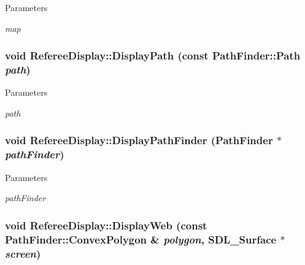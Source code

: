 \begin{DoxyParams}{Parameters}
\item[{\em map}]\end{DoxyParams}
\hypertarget{classRefereeDisplay_ad7f07077e92fd46956bf1aa25715e414}{
\subsubsection[{DisplayPath}]{\setlength{\rightskip}{0pt plus 5cm}void RefereeDisplay::DisplayPath (const {\bf PathFinder::Path} {\em path})}}
\label{classRefereeDisplay_ad7f07077e92fd46956bf1aa25715e414}

\begin{DoxyParams}{Parameters}
\item[{\em path}]\end{DoxyParams}
\hypertarget{classRefereeDisplay_a0ef334a53e0fde02da30460ed2fcbe06}{
\subsubsection[{DisplayPathFinder}]{\setlength{\rightskip}{0pt plus 5cm}void RefereeDisplay::DisplayPathFinder ({\bf PathFinder} $\ast$ {\em pathFinder})}}
\label{classRefereeDisplay_a0ef334a53e0fde02da30460ed2fcbe06}

\begin{DoxyParams}{Parameters}
\item[{\em pathFinder}]\end{DoxyParams}
\hypertarget{classRefereeDisplay_ae40cc8040d1fe441a8f38fe2fc0b8974}{
\subsubsection[{DisplayWeb}]{\setlength{\rightskip}{0pt plus 5cm}void RefereeDisplay::DisplayWeb (const {\bf PathFinder::ConvexPolygon} \& {\em polygon}, \/  SDL\_\-Surface $\ast$ {\em screen})}}
\label{classRefereeDisplay_ae40cc8040d1fe441a8f38fe2fc0b8974}

